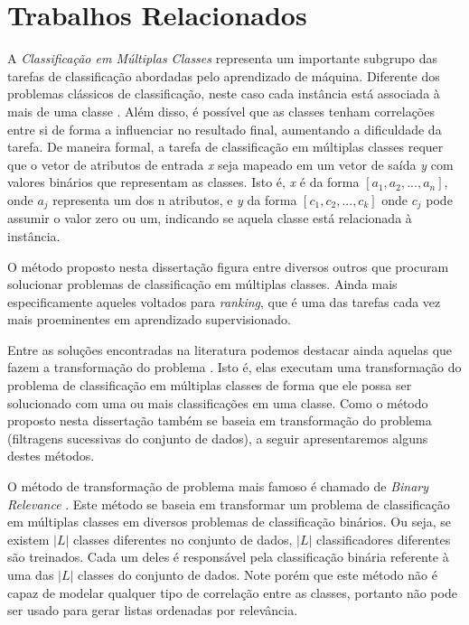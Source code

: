 \chapter{Trabalhos Relacionados}

A \textit{Classificação em Múltiplas Classes} representa um importante subgrupo das tarefas de classificação abordadas pelo aprendizado de máquina.
Diferente dos problemas clássicos de classificação, neste caso cada instância está associada à mais de uma classe \cite{Tsoumakas}.
Além disso, é possível que as classes tenham correlações entre si de forma a influenciar no resultado final, aumentando a dificuldade da tarefa.
De maneira formal, a tarefa de classificação em múltiplas classes requer que o vetor de atributos de entrada \textit{x} seja mapeado em um vetor de saída \textit{y} com valores binários que representam as classes.
Isto é, \textit{x} é da forma $[a_1, a_2, ..., a_n]$, onde $a_j$ representa um dos n atributos, e \textit{y} da forma $[c_1, c_2, ... , c_k]$ onde $c_j$ pode assumir o valor zero ou um, indicando se aquela classe está relacionada à instância.  

O método proposto nesta dissertação figura entre diversos outros que procuram solucionar problemas de classificação em múltiplas classes.
Ainda mais especificamente aqueles voltados para \textit{ranking}, que é uma das tarefas cada vez mais proeminentes em aprendizado supervisionado.

Entre as soluções encontradas na literatura podemos destacar ainda aquelas que fazem a transformação do problema \cite{Tsoumakas}.
Isto é, elas executam uma transformação do problema de classificação em múltiplas classes de forma que ele possa ser solucionado com uma ou mais classificações em uma classe.
Como o método proposto nesta dissertação também se baseia em transformação do problema (filtragens sucessivas do conjunto de dados), a seguir apresentaremos alguns destes métodos.

O método de transformação de problema mais famoso é chamado de \textit{Binary Relevance} \cite{Tsoumakas, Godbole, Zhang}.
Este método se baseia em transformar um problema de classificação em múltiplas classes em diversos problemas de classificação binários.
Ou seja, se existem $\vert L \vert$ classes diferentes no conjunto de dados, $\vert L \vert$ classificadores diferentes são treinados.
Cada um deles é responsável pela classificação binária referente à uma das $\vert L \vert$ classes do conjunto de dados.
Note porém que este método não é capaz de modelar qualquer tipo de correlação entre as classes, portanto não pode ser usado para gerar listas ordenadas por relevância.

